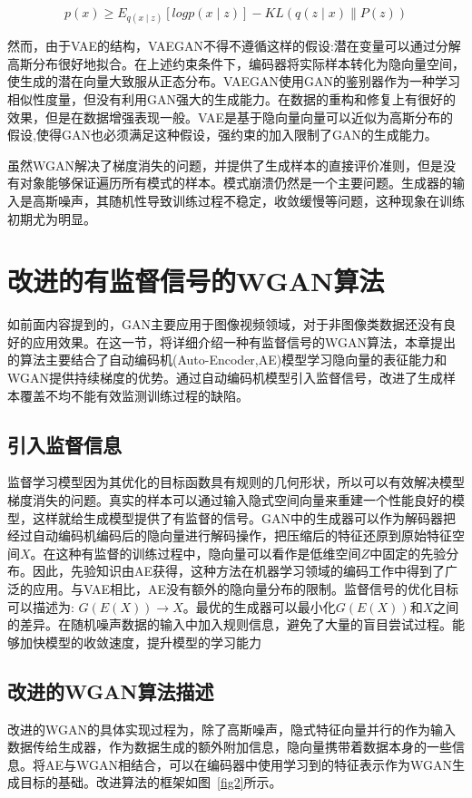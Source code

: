 \begin{equation}
p(x)\geq E_{q(x\mid z)}[log p (x\mid z)]- KL(q(z\mid x)\parallel P (z))
\end{equation}

然而，由于VAE的结构，VAEGAN不得不遵循这样的假设:潜在变量可以通过分解高斯分布很好地拟合。在上述约束条件下，编码器将实际样本转化为隐向量空间，使生成的潜在向量大致服从正态分布。VAEGAN使用GAN的鉴别器作为一种学习相似性度量，但没有利用GAN强大的生成能力。在数据的重构和修复上有很好的效果，但是在数据增强表现一般。VAE是基于隐向量向量可以近似为高斯分布的假设,使得GAN也必须满足这种假设，强约束的加入限制了GAN的生成能力。

虽然WGAN解决了梯度消失的问题，并提供了生成样本的直接评价准则，但是没有对象能够保证遍历所有模式的样本。模式崩溃仍然是一个主要问题。生成器的输入是高斯噪声，其随机性导致训练过程不稳定，收敛缓慢\cite{17}等问题，这种现象在训练初期尤为明显。

\section{改进的有监督信号的WGAN算法}
如前面内容提到的，GAN主要应用于图像视频领域，对于非图像类数据还没有良好的应用效果。在这一节，将详细介绍一种有监督信号的WGAN算法，本章提出的算法主要结合了自动编码机(Auto-Encoder,AE)模型学习隐向量的表征能力和WGAN提供持续梯度的优势。通过自动编码机模型引入监督信号，改进了生成样本覆盖不均不能有效监测训练过程的缺陷。
\subsection{引入监督信息}
监督学习模型因为其优化的目标函数具有规则的几何形状，所以可以有效解决模型梯度消失的问题\cite{11}。真实的样本可以通过输入隐式空间向量来重建一个性能良好的模型，这样就给生成模型提供了有监督的信号。GAN中的生成器可以作为解码器把经过自动编码机编码后的隐向量进行解码操作，把压缩后的特征还原到原始特征空间$X$。在这种有监督的训练过程中，隐向量可以看作是低维空间$Z$中固定的先验分布。因此，先验知识由AE获得，这种方法在机器学习领域的编码工作中得到了广泛的应用。与VAE相比，AE没有额外的隐向量分布的限制。监督信号的优化目标可以描述为:  $ G(E(X))\rightarrow X $。最优的生成器可以最小化$ G(E(X))$和$X$之间的差异。在随机噪声数据的输入中加入规则信息，避免了大量的盲目尝试过程。能够加快模型的收敛速度，提升模型的学习能力
\subsection{改进的WGAN算法描述}
改进的WGAN的具体实现过程为，除了高斯噪声，隐式特征向量并行的作为输入数据传给生成器，作为数据生成的额外附加信息，隐向量携带着数据本身的一些信息。将AE与WGAN相结合，可以在编码器中使用学习到的特征表示作为WGAN生成目标的基础。改进算法的框架如图~\ref{fig2}所示。

